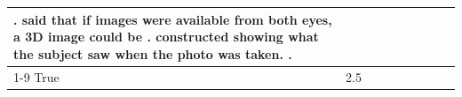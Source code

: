 \begin{table}[H]
\begin{tabular}{lllrlllll}
. said that if images were available from both eyes, a 3D image could be . constructed showing what the subject saw when the photo was taken. . \\
\cline{1-9}
True & 2.5%
\end{tabular}
\end{table}

